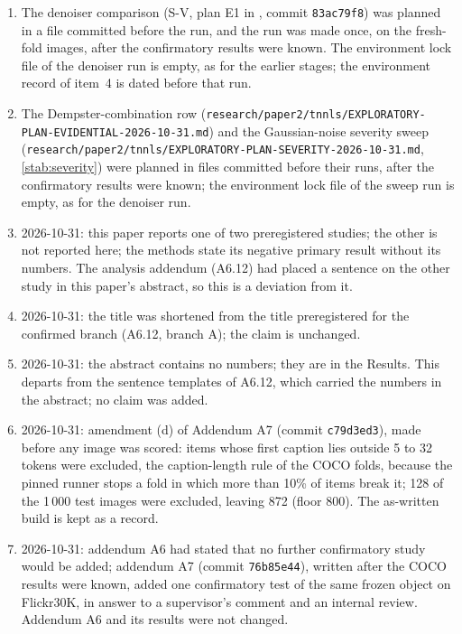 \documentclass[journal,onecolumn]{IEEEtran}
\theoremstyle{plain}
\begin{document}
\begin{enumerate}
\item The denoiser comparison (S-V, plan E1 in \texttt{}, commit \texttt{83ac79f8}) was planned in a file committed before the run, and the run was made once, on the fresh-fold images, after the confirmatory results were known. The environment lock file of the denoiser run is empty, as for the earlier stages; the environment record of item~4 is dated before that run.
\item The Dempster-combination row (\nolinkurl{research/paper2/tnnls/EXPLORATORY-PLAN-EVIDENTIAL-2026-10-31.md}) and the Gaussian-noise severity sweep (\nolinkurl{research/paper2/tnnls/EXPLORATORY-PLAN-SEVERITY-2026-10-31.md}, \cref{stab:severity}) were planned in files committed before their runs, after the confirmatory results were known; the environment lock file of the sweep run is empty, as for the denoiser run.
\item 2026-10-31: this paper reports one of two preregistered studies; the other is not reported here; the methods state its negative primary result without its numbers. The analysis addendum (A6.12) had placed a sentence on the other study in this paper's abstract, so this is a deviation from it.
\item 2026-10-31: the title was shortened from the title preregistered for the confirmed branch (A6.12, branch A); the claim is unchanged.
\item 2026-10-31: the abstract contains no numbers; they are in the Results. This departs from the sentence templates of A6.12, which carried the numbers in the abstract; no claim was added.
\item 2026-10-31: amendment (d) of Addendum A7 (commit \texttt{c79d3ed3}), made before any image was scored: items whose first caption lies outside 5 to 32 tokens were excluded, the caption-length rule of the COCO folds, because the pinned runner stops a fold in which more than 10\% of items break it; 128 of the 1\,000 test images were excluded, leaving 872 (floor 800). The as-written build is kept as a record.
\item 2026-10-31: addendum A6 had stated that no further confirmatory study would be added; addendum A7 (commit \texttt{76b85e44}), written after the COCO results were known, added one confirmatory test of the same frozen object on Flickr30K, in answer to a supervisor's comment and an internal review. Addendum A6 and its results were not changed.
\end{enumerate}
\end{document}
